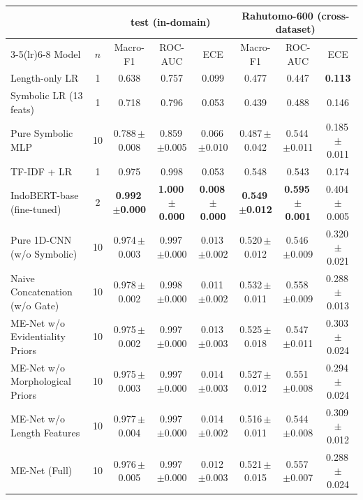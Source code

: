 \begin{tabular}{lccccccc}
\toprule
& & \multicolumn{3}{c}{\iph{} test (in-domain)} & \multicolumn{3}{c}{Rahutomo-600 (cross-dataset)} \\
\cmidrule(lr){3-5}\cmidrule(lr){6-8}
Model & $n$ & Macro-F1 & ROC-AUC & ECE & Macro-F1 & ROC-AUC & ECE \\
\midrule
Length-only LR & 1 & 0.638 & 0.757 & 0.099 & 0.477 & 0.447 & \textbf{0.113} \\
Symbolic LR (13 feats) & 1 & 0.718 & 0.796 & 0.053 & 0.439 & 0.488 & 0.146 \\
Pure Symbolic MLP & 10 & 0.788\,{\scriptsize$\pm$0.008} & 0.859\,{\scriptsize$\pm$0.005} & 0.066\,{\scriptsize$\pm$0.010} & 0.487\,{\scriptsize$\pm$0.042} & 0.544\,{\scriptsize$\pm$0.011} & 0.185\,{\scriptsize$\pm$0.011} \\
\midrule
TF-IDF + LR & 1 & 0.975 & 0.998 & 0.053 & 0.548 & 0.543 & 0.174 \\
IndoBERT-base (fine-tuned) & 2 & \textbf{0.992\,{\scriptsize$\pm$0.000}} & \textbf{1.000\,{\scriptsize$\pm$0.000}} & \textbf{0.008\,{\scriptsize$\pm$0.000}} & \textbf{0.549\,{\scriptsize$\pm$0.012}} & \textbf{0.595\,{\scriptsize$\pm$0.001}} & 0.404\,{\scriptsize$\pm$0.005} \\
\midrule
Pure 1D-CNN (w/o Symbolic) & 10 & 0.974\,{\scriptsize$\pm$0.003} & 0.997\,{\scriptsize$\pm$0.000} & 0.013\,{\scriptsize$\pm$0.002} & 0.520\,{\scriptsize$\pm$0.012} & 0.546\,{\scriptsize$\pm$0.009} & 0.320\,{\scriptsize$\pm$0.021} \\
Naive Concatenation (w/o Gate) & 10 & 0.978\,{\scriptsize$\pm$0.002} & 0.998\,{\scriptsize$\pm$0.000} & 0.011\,{\scriptsize$\pm$0.002} & 0.532\,{\scriptsize$\pm$0.011} & 0.558\,{\scriptsize$\pm$0.009} & 0.288\,{\scriptsize$\pm$0.013} \\
ME-Net w/o Evidentiality Priors & 10 & 0.975\,{\scriptsize$\pm$0.002} & 0.997\,{\scriptsize$\pm$0.000} & 0.013\,{\scriptsize$\pm$0.003} & 0.525\,{\scriptsize$\pm$0.018} & 0.547\,{\scriptsize$\pm$0.011} & 0.303\,{\scriptsize$\pm$0.024} \\
ME-Net w/o Morphological Priors & 10 & 0.975\,{\scriptsize$\pm$0.003} & 0.997\,{\scriptsize$\pm$0.000} & 0.014\,{\scriptsize$\pm$0.003} & 0.527\,{\scriptsize$\pm$0.012} & 0.551\,{\scriptsize$\pm$0.008} & 0.294\,{\scriptsize$\pm$0.024} \\
ME-Net w/o Length Features & 10 & 0.977\,{\scriptsize$\pm$0.004} & 0.997\,{\scriptsize$\pm$0.000} & 0.014\,{\scriptsize$\pm$0.002} & 0.516\,{\scriptsize$\pm$0.011} & 0.544\,{\scriptsize$\pm$0.008} & 0.309\,{\scriptsize$\pm$0.012} \\
\midrule
ME-Net (Full) & 10 & 0.976\,{\scriptsize$\pm$0.005} & 0.997\,{\scriptsize$\pm$0.000} & 0.012\,{\scriptsize$\pm$0.003} & 0.521\,{\scriptsize$\pm$0.015} & 0.557\,{\scriptsize$\pm$0.007} & 0.288\,{\scriptsize$\pm$0.024} \\
\bottomrule
\end{tabular}%
